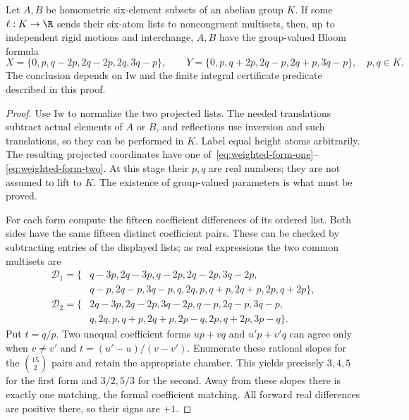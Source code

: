 \begin{lemma}\label{lem:bf}
Let $A,B$ be homometric six-element subsets of an abelian group $K$.
If some $\ell:K\to\R$ sends their six-atom lists to noncongruent
multisets, then, up to independent rigid motions and interchange,
$A,B$ have the group-valued Bloom formula
\[
 X=\{0,p,q-2p,2q-2p,2q,3q-p\},\qquad
 Y=\{0,p,q+2p,2q-p,2q+p,3q-p\},\quad p,q\in K.
\]
The conclusion depends on Iw and the finite integral certificate predicate
described in this proof.
\end{lemma}
\begin{proof}
Use Iw to normalize the two projected lists. The needed translations
subtract actual elements of $A$ or $B$, and reflections use inversion
and such translations, so they can be performed in $K$. Label equal
height atoms arbitrarily. The resulting projected coordinates have one
of~\eqref{eq:weighted-form-one}--\eqref{eq:weighted-form-two}. At this
stage their $p,q$ are real numbers; they are not assumed to lift to $K$.
The existence of group-valued parameters is what must be proved.

For each form compute the fifteen coefficient differences of its ordered
list. Both sides have the same fifteen distinct coefficient pairs. These
can be checked by subtracting entries of the displayed lists; as real
expressions the two common multisets are
\begin{align*}
 \mathcal D_1=\{&q-3p,2q-3p,q-2p,2q-2p,3q-2p,\\
 &q-p,2q-p,3q-p,q,2q,p,q+p,2q+p,2p,q+2p\},\\
 \mathcal D_2=\{&2q-3p,2q-2p,3q-2p,q-p,2q-p,3q-p,\\
 &q,2q,p,q+p,2q+p,2p-q,2p,q+2p,3p-q\}.
\end{align*}
Put $t=q/p$. Two unequal coefficient forms $up+vq$ and $u'p+v'q$
can agree only when $v\ne v'$ and
$t=(u'-u)/(v-v')$. Enumerate these rational slopes for the $\binom{15}{2}$
pairs and retain the appropriate chamber. This yields precisely $3,4,5$
for the first form and $3/2,5/3$ for the second. Away from these slopes
there is exactly one matching, the formal coefficient matching. All
forward real differences are positive there, so their signs are $+1$.


\end{proof}
